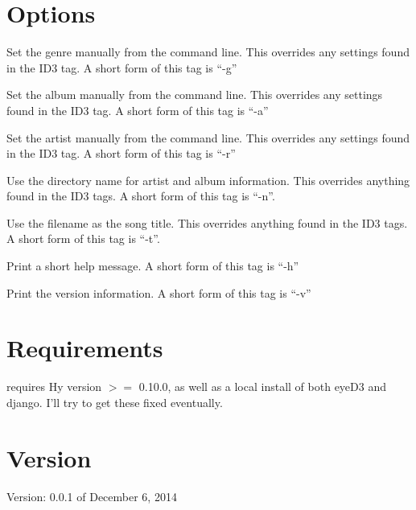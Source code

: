 \documentclass[english]{article}
\begin{document}
\section{Options}
\begin{Description}
\item[\OptArg{--genre}{ genre}] Set the genre manually from the command
  line.  This overrides any settings found in the ID3 tag.  A short form
  of this tag is ``-g''

\item[\OptArg{--album}{ album}] Set the album manually from the command
  line.  This overrides any settings found in the ID3 tag.  A short form
  of this tag is ``-a''

\item[\OptArg{--artist}{ artist}] Set the artist manually from the command
  line.  This overrides any settings found in the ID3 tag.  A short form
  of this tag is ``-r''

\item[\Opt{--usedir}] Use the directory name for artist and album
  information.  This overrides anything found in the ID3 tags.  A short
  form of this tag is ``-n''.

\item[\Opt{--usefilename}] Use the filename as the song title.  This
  overrides anything found in the ID3 tags.  A short form of this tag is
  ``-t''.

\item[\Opt{--help}] Print a short help message.  A short form of this
  tag is ``-h''

\item[\Opt{--version}] Print the version information.  A short form of this
  tag is ``-v''
\end{Description}

\section{Requirements}

\begin{description}\setlength{\itemsep}{1cm}
\item[Hy]  requires Hy version $>=$ 0.10.0, as well as
  a local install of both eyeD3 and django.  I'll try to get these
  fixed eventually.

\end{description}

\section{Version}
Version: 0.0.1 of December 6, 2014
\end{document}
